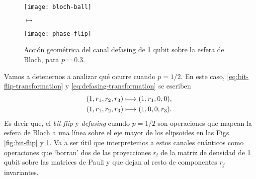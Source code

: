 \begin{figure}
\centering
\begin{minipage}{.4\textwidth}
    \centering
    \texttt{[image: bloch-ball]}
\end{minipage}
\LARGE{$\longmapsto$}
\begin{minipage}{0.4\textwidth}
    \centering
    \texttt{[image: phase-flip]}
\end{minipage}
\caption{
Acción geométrica del canal defasing de 1 qubit sobre la 
esfera de Bloch, para $p=0.3$. \ep}
\label{fig:phase-flip}
\end{figure}
Vamos a detenernos a analizar qué ocurre cuando $p=1/2$. 
En este caso, \eqref{eq:bit-flip-transformation} y
\eqref{eq:defasing-transformation} se escriben
\begin{align}\label{eq:bit-flip_p=0.5}
\qty(1,r_1,r_2,r_3)&\longmapsto \qty(1,r_1,0,0),\\
\qty(1,r_1,r_2,r_3)&\longmapsto \qty(1,0,0,r_3).\label{eq:defasing_p=0.5}
\end{align}
Es decir que, el \textit{bit-flip} y \textit{defasing} cuando $p=1/2$
son operaciones que mapean la esfera de Bloch a una línea sobre 
el eje mayor de los elipsoides en las Figs. \ref{fig:bit-flip} y \ref{fig:phase-flip}.
Va a ser útil que interpretemos a estos canales cuánticos 
como operaciones que `borran' dos de las proyecciones
$r_i$  de la matriz de densidad de 1 qubit sobre
las matrices de Pauli y que dejan al resto de componentes $r_j$ invariantes.


